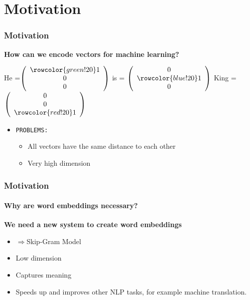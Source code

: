 
\section{Motivation}
\begin{frame}\frametitle{Motivation}
\textbf{How can we encode vectors for machine learning? }\\
\bigskip 
\centerline{
He =$
\left(
\begin{array}{c}
\rowcolor{green! 20}
1\\
0\\
0\\
\end{array}\right)
$
is = $
\left(
\begin{array}{c}
0\\
\rowcolor{blue! 20}
1\\
0\\
\end{array}\right)
$
King =
$
\left(
\begin{array}{c}
0\\
0\\
\rowcolor{red! 20}
1\\
\end{array}\right)
$}
\bigskip
\begin{itemize}
    \item \texttt{PROBLEMS:}
    \begin{itemize}
    \item All vectors have the same distance to each other
    \item Very high dimension 
    \end{itemize}
\end{itemize}
\end{frame}
\begin{frame}\frametitle {Motivation}
    \framesubtitle{Why are word embeddings necessary?}
    \textbf{We need a new system to create word embeddings }
      \begin{itemize}
 \item $\Rightarrow $Skip-Gram Model
 \item Low dimension
 \item Captures meaning
 \item Speeds up and improves other NLP tasks, for example machine translation. 
 \end{itemize}
  \end{frame}
